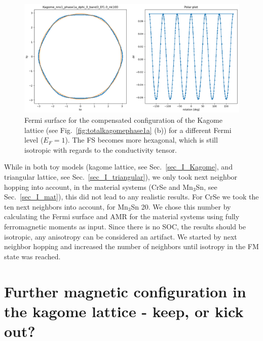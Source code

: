\documentclass[prb,showpacs,amsmath,amssymb,superscriptaddress,twocolumn,floatfix]{revtex4-1}
\begin{document}
\begin{appendix}
\begin{figure}
	\centering
	\includegraphics[width=\linewidth]{img/Kagome_nns1_phase1a_dphi_0_band3_Ef1.0_nk100}
	\caption{Fermi surface for the compensated configuration of the Kagome lattice (see Fig.~\ref{fig:totalkagomephase1a} (b)) for a different Fermi level ($E_F = 1$). The FS becomes more hexagonal, which is still isotropic with regards to the conductivity tensor.}
	\label{fig:kagomenns1phase1adphi0band3ef1}
\end{figure}



While in both toy models (kagome lattice, see Sec.~\ref{sec_I_Kagome}, and triangular lattice, see Sec.~\ref{sec_I_triangular}), we only took next neighbor hopping into account, in the material systems (CrSe and Mn$_3$Sn, see Sec.~\ref{sec_I_mat}), this did not lead to any realistic results. For CrSe we took the ten next neighbors into account, for Mn$_3$Sn 20. We chose this number by calculating the Fermi surface and AMR for the material systems using fully ferromagnetic moments as input. Since there is no SOC, the results should be isotropic, any anisotropy can be considered an artifact. We started by next neighbor hopping and increased the number of neighbors until isotropy in the FM state was reached.

\section{Further magnetic configuration in the kagome lattice {\color{red} - keep, or kick out?} }


\end{appendix}
\end{document}
